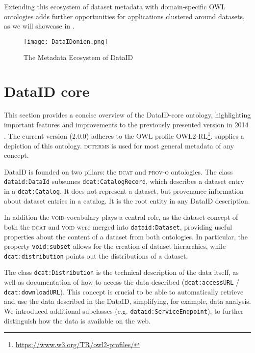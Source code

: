 \documentclass[runningheads,a4paper]{llncs}
\newcommand{\prov}{{\scshape prov-o}\xspace}
\newcommand{\void}{{\scshape void}\xspace}
\newcommand{\dct}{{\scshape dcterms}\xspace}
\newcommand{\dcat}{{\scshape dcat}\xspace}
\newcommand{\prop}[1]{{{\texttt{#1}}}}
\newcommand\footnoteurl[1]{\footnote{\scriptsize\url{#1}}}
\begin{document}
Extending this ecosystem of dataset metadata with domain-specific OWL ontologies adds further opportunities for applications clustered around datasets, as we will showcase in .

\begin{figure}[t]
\centering
  \texttt{[image: DataIDonion.png]}
  \caption{The Metadata Ecosystem of DataID}
  \label{fig:onion}
  \vspace{-1.5em}
\end{figure}

\section{DataID core} %
\label{dataidCore}
This section provides a concise overview of the DataID-core ontology, highlighting important features and improvements to the previously presented version in 2014 \cite{dataID2014}. The current version (2.0.0) adheres to the OWL profile OWL2-RL\footnoteurl{https://www.w3.org/TR/owl2-profiles/}.
 supplies a depiction of this ontology. \dct is used for most general metadata of any concept.

DataID is founded on two pillars: the \dcat and \prov ontologies. The class \prop{dataid:DataId} subsumes \prop{dcat:CatalogRecord}, which describes a dataset entry in a \prop{dcat:Catalog}. It does not represent a dataset, but provenance information about dataset entries in a catalog. It is the root entity in any DataID description.

In addition the \void vocabulary plays a central role, as the dataset concept of both the \dcat and \void were merged into \prop{dataid:Dataset}, providing useful properties about the content of a dataset from both ontologies. In particular, the property \prop{void:subset} allows for the creation of dataset hierarchies, while \prop{dcat:distribution} points out the distributions of a dataset.

The class \prop{dcat:Distribution} is the technical description of the data itself, as well as documentation of how to access the data described (\prop{dcat:accessURL} / \prop{dcat:downloadURL}). This concept is crucial to be able to automatically retrieve and use the data described in the DataID, simplifying, for example, data analysis. We introduced additional subclasses (e.g. \prop{dataid:ServiceEndpoint}), to further distinguish how the data is available on the web.
\end{document}
